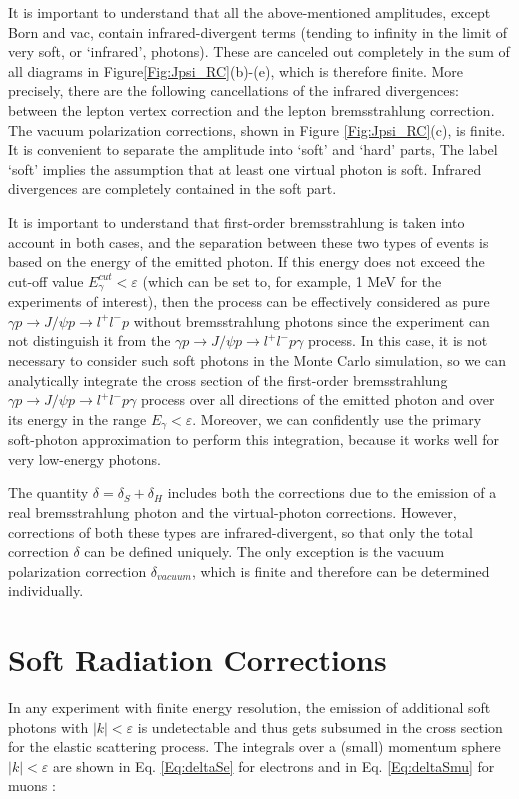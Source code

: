 \documentclass[prd,onecolumn,showpcs,amsmath,amssymb,nofootinbib,notitlepage,preprintnumbers,balancelastpage,longbibliography]{revtex4-2}
\begin{document}
It is important to understand that all the above-mentioned amplitudes, except Born and
vac, contain infrared-divergent terms (tending to infinity in the limit of very soft, or
‘infrared’, photons). These are canceled out completely in the sum of all diagrams in Figure\ref{Fig:Jpsi_RC}(b)-(e), which is therefore
finite. More precisely, there are the following cancellations of the infrared divergences: between the lepton vertex correction and the lepton bremsstrahlung
correction. The vacuum polarization corrections, shown in Figure \ref{Fig:Jpsi_RC}(c), is finite.
It is convenient to separate the amplitude into ‘soft’ and ‘hard’ parts,
The label ‘soft’ implies the assumption that at least
one virtual photon is soft. Infrared divergences are completely
contained in the soft part. 
 
It is important to understand that first-order bremsstrahlung is taken into
account in both cases, and the separation between these two types of events is based on the
energy of the emitted photon. If this energy does not exceed the cut-off value $E_\gamma^{cut}<\varepsilon$ (which can
be set to, for example, 1 MeV for the experiments of interest), then the process can
be effectively considered as pure $\gamma p\to J/\psi p\to l^+l^-p$ without bremsstrahlung photons since the experiment can not distinguish it from the  
$\gamma p\to J/\psi p\to l^+l^-p \gamma$ process. In this case, it is not necessary to consider such soft photons in the Monte
Carlo simulation, so we can analytically integrate the cross section of the first-order bremsstrahlung $\gamma  p\to J/\psi p\to l^+l^-p \gamma$ 
process over all directions of the emitted photon and over its energy in
the range $E_\gamma<\varepsilon$. Moreover, we can confidently use the primary soft-photon approximation
to perform this integration, because it works well for very low-energy photons. 

The quantity $\delta=\delta_S+\delta_H$
includes both the corrections due to the emission of a real bremsstrahlung photon and the
virtual-photon corrections. However, corrections of both these types are
infrared-divergent, so that only the total correction $\delta$ can be defined uniquely. The only
exception is the vacuum polarization correction $\delta_{vacuum}$, which is finite and therefore can be
determined individually.

\section{Soft Radiation Corrections}
In any experiment with finite energy resolution, the emission of additional soft photons with $|k|<\varepsilon$  is undetectable and
thus gets subsumed in the cross section for the elastic scattering process. 
The integrals  over a (small) momentum sphere 
$|k|<\varepsilon$ are shown in Eq. \ref{Eq:deltaSe} for electrons and in Eq. \ref{Eq:deltaSmu} for muons \cite{Ehlotzky1968}:
\end{document}
